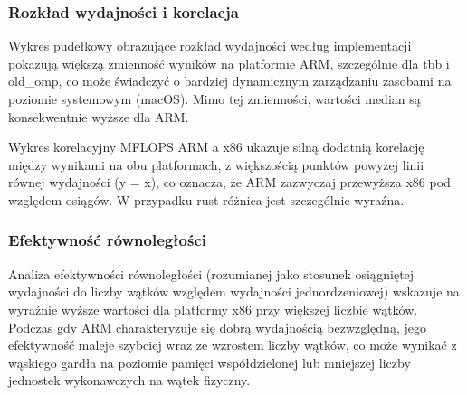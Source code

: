 \subsubsection{Rozkład wydajności i korelacja}
Wykres pudełkowy obrazujące rozkład wydajności według implementacji pokazują większą zmienność wyników na platformie ARM, szczególnie dla tbb i old\_omp, co może świadczyć o bardziej dynamicznym zarządzaniu zasobami na poziomie systemowym (macOS). Mimo tej zmienności, wartości median są konsekwentnie wyższe dla ARM.

Wykres korelacyjny MFLOPS ARM a x86 ukazuje silną dodatnią korelację między wynikami na obu platformach, z większością punktów powyżej linii równej wydajności (y = x), co oznacza, że ARM zazwyczaj przewyższa x86 pod względem osiągów. W przypadku rust różnica jest szczególnie wyraźna.

\subsubsection{Efektywność równoległości}
Analiza efektywności równoległości (rozumianej jako stosunek osiągniętej wydajności do liczby wątków względem wydajności jednordzeniowej) wskazuje na wyraźnie wyższe wartości dla platformy x86 przy większej liczbie wątków. Podczas gdy ARM charakteryzuje się dobrą wydajnością bezwzględną, jego efektywność maleje szybciej wraz ze wzrostem liczby wątków, co może wynikać z wąskiego gardła na poziomie pamięci współdzielonej lub mniejszej liczby jednostek wykonawczych na wątek fizyczny.

